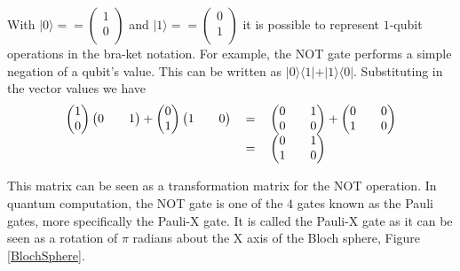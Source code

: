 \documentclass[authoryearcitations]{UoYCSproject}
\begin{document}
With
$\vert
0
\rangle
== 
\begin {pmatrix}
1\\
0\\
\end{pmatrix}
$
and
$\vert
1
\rangle
==  
\begin {pmatrix}
0\\
1\\
\end{pmatrix}
$
it is possible to represent $1$-qubit operations in the bra-ket notation.
For example, the NOT gate performs a simple negation of a qubit's value.
This can be written as $\vert0\rangle\langle1\vert + \vert1\rangle\langle0\vert$.
Substituting in the vector values we have
\begin{equation}
\begin{tabular}{ r c l }
\(\begin {pmatrix}
1\\
0
\end{pmatrix}
\begin {pmatrix}
0&&
1
\end{pmatrix}
 + 
\begin {pmatrix}
0\\
1
\end{pmatrix}
\begin {pmatrix}
1&&
0
\end{pmatrix}\)
& \(=\)
& \( 
\begin{pmatrix}
0 && 1 \\
0 && 0
\end{pmatrix}
 + 
\begin{pmatrix}
0 && 0\\
1 && 0
\end{pmatrix}
\) \\
& \(=\)
& \( 
\begin{pmatrix}
0 && 1 \\
1 && 0
\end{pmatrix}
\)
\end{tabular}
\label{eq:notexplanded}
\end{equation}

This matrix can be seen as a transformation matrix for the NOT operation.
In quantum computation, the NOT gate is one of the $4$ gates known as the Pauli gates, more specifically the Pauli-X gate.
It is called the Pauli-X gate as it can be seen as a rotation of $\pi$ radians about the X axis of the Bloch sphere, Figure \ref{BlochSphere}.
\end{document}
